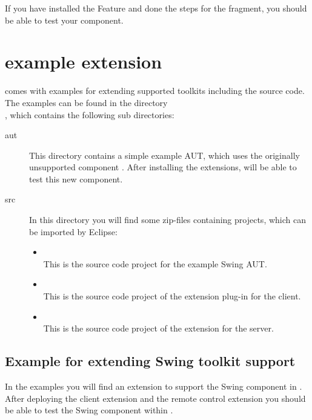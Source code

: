 If you have installed the Feature and done the steps for the fragment, you
should be able to test your component.

\section{\app{} example extension}
\label{remoteControlExamples}

\app{} comes with examples for extending supported toolkits including the
source code. The examples can be found in the directory\\
,
which contains the following sub directories:

\begin{description}
 \item[aut] This directory contains a simple example AUT, which uses the
 originally unsupported component . After installing the
 extensions, \app{} will be able to test this new component.
 \item[src] In this directory you will find some zip-files containing
 projects, which can be imported by Eclipse:
 \begin{itemize}
   \item {} \\
   This is the source code project for the example Swing AUT.
   \item {} \\
   This is the source code project of the extension plug-in for the \app{}
   client.
   \item {} \\
   This is the source code project of the extension for the \app{} server.
 \end{itemize}
\end{description}

\subsection{Example for extending Swing toolkit support}

In the examples you will find an extension to support the Swing component
 in \app{}. After deploying the \app{} client extension and the
\app{} remote control extension you should be able to test the Swing component
 within \app{}.

